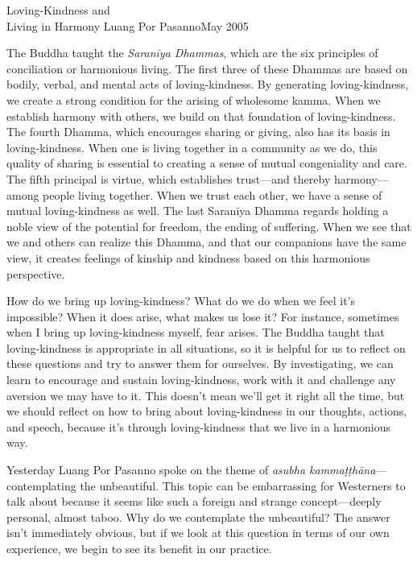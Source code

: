 {Loving-Kindness and\\Living in Harmony}
{Luang Por Pasanno}{May 2005}

The Buddha taught the \emph{Saranīya Dhammas}, which are the six 
principles of conciliation or harmonious living. The first three of 
these Dhammas are based on bodily, verbal, and mental acts of 
loving-kindness. By generating loving-kindness, we create a strong 
condition for the arising of wholesome kamma. When we establish harmony 
with others, we build on that foundation of loving-kindness. The fourth 
Dhamma, which encourages sharing or giving, also has its basis in 
loving-kindness. When one is living together in a community as we do, 
this quality of sharing is essential to creating a sense of mutual 
congeniality and care. The fifth principal is virtue, which establishes 
trust---and thereby harmony---among people living together. When we 
trust each other, we have a sense of mutual loving-kindness as well. 
The last Saranīya Dhamma regards holding a noble view of the potential 
for freedom, the ending of suffering. When we see that we and others 
can realize this Dhamma, and that our companions have the same view, it 
creates feelings of kinship and kindness based on this harmonious 
perspective.

How do we bring up loving-kindness? What do we do when we feel it's 
impossible? When it does arise, what makes us lose it? For instance, 
sometimes when I bring up loving-kindness myself, fear arises. The 
Buddha taught that loving-kindness is appropriate in all situations, so 
it is helpful for us to reflect on these questions and try to answer 
them for ourselves. By investigating, we can learn to encourage and 
sustain loving-kindness, work with it and challenge any aversion we may 
have to it. This doesn't mean we'll get it right all the time, but we 
should reflect on how to bring about loving-kindness in our thoughts, 
actions, and speech, because it's through loving-kindness that we live 
in a harmonious way.


Yesterday Luang Por Pasanno spoke on the theme of \emph{asubha 
kammaṭṭhāna}---contemplating the unbeautiful. This topic can be 
embarrassing for Westerners to talk about because it seems like such a 
foreign and strange concept---deeply personal, almost taboo. Why do we 
contemplate the unbeautiful? The answer isn't immediately obvious, but 
if we look at this question in terms of our own experience, we begin to 
see its benefit in our practice.

